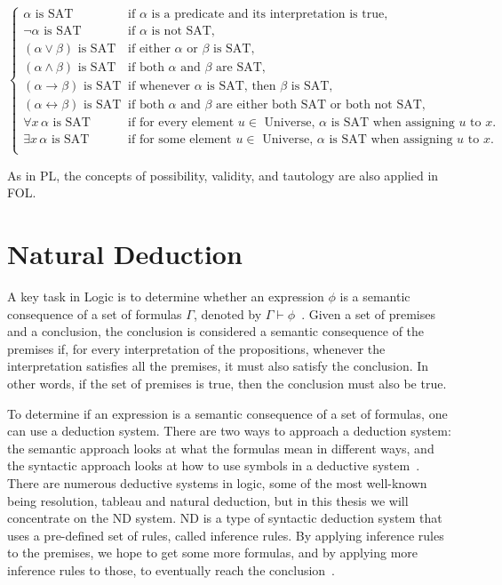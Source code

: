 \[
    \left\{
    \begin{array}{ll}
        \alpha \text{ is SAT}  & \text{if } \alpha \text{ is a predicate and its interpretation is true}, \\
        \neg \alpha \text{ is SAT} & \text{if } \alpha \text{ is not SAT,} \\
        (\alpha \lor \beta) \text{ is SAT} & \text{if either } \alpha \text{ or } \beta \text{ is SAT,} \\
        (\alpha \land \beta) \text{ is SAT} & \text{if both } \alpha \text{ and } \beta \text{ are SAT,} \\
        (\alpha \rightarrow \beta) \text{ is SAT} & \text{if whenever } \alpha \text{ is SAT, then } \beta \text{ is SAT,} \\
        (\alpha \leftrightarrow \beta) \text{ is SAT} & \text{if both } \alpha \text{ and } \beta \text{ are either both SAT or both not SAT,} \\
        \forall x \, \alpha \text{ is SAT} & \text{if for every element } u \in \text{ Universe, } \alpha \text{ is SAT when assigning } u \text{ to } x. \\
        \exists x \, \alpha \text{ is SAT} & \text{if for some element } u \in \text{ Universe, } \alpha \text{ is SAT when assigning } u \text{ to } x. \\
    \end{array}
    \right.
\]

As in \gls{PL}, the concepts of possibility, validity, and tautology are also applied in \gls{FOL}.

\section{Natural Deduction} 

\label{chap:prop-deduction}
A key task in Logic is to determine whether an expression \(\phi\) is a semantic consequence of a set of formulas \(\Gamma\), denoted by \(\Gamma \vdash \phi\)~\cite{gouveia_lgica}. Given a set of premises and a conclusion, the conclusion is considered a semantic consequence of the premises if, for every interpretation of the propositions, whenever the interpretation satisfies all the premises, it must also satisfy the conclusion. In other words, if the set of premises is true, then the conclusion must also be true. 

To determine if an expression is a semantic consequence of a set of formulas, one can use a deduction system. There are two ways to approach a deduction system: the semantic approach looks at what the formulas mean in different ways, and the syntactic approach looks at how to use symbols in a deductive system~\cite{gouveia_lgica}. There are numerous deductive systems in logic, some of the most well-known being  resolution, tableau and natural deduction, but in this thesis we will concentrate on the \gls{ND} system. \gls{ND} is a type of syntactic deduction system that uses a pre-defined set of rules, called inference rules. By applying inference rules to the premises, we hope to get some more formulas, and by applying more inference rules to those, to eventually reach the conclusion~\cite{huth_2004_logic}.

